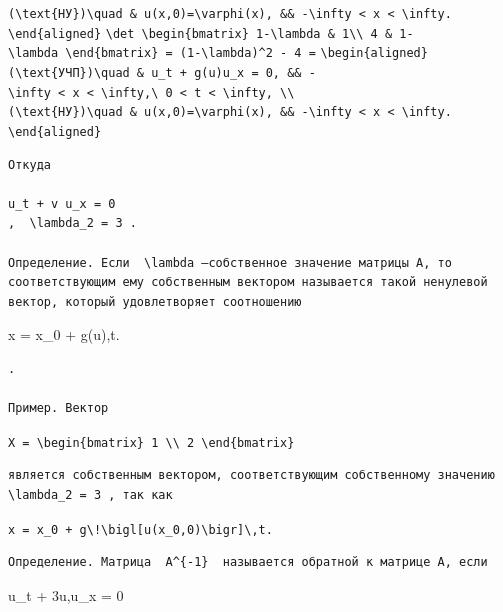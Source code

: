 \documentclass[
  ukrainian,
]{article}
\begin{document}
\texttt{(\textbackslash{}text\{НУ\})\textbackslash{}quad\ \&\ u(x,0)=\textbackslash{}varphi(x),\ \&\&\ -\textbackslash{}infty\ \textless{}\ x\ \textless{}\ \textbackslash{}infty.}
\texttt{\textbackslash{}end\{aligned\}}
\texttt{\textbackslash{}det\ \textbackslash{}begin\{bmatrix\}\ 1-\textbackslash{}lambda\ \&\ 1\textbackslash{}\textbackslash{}\ 4\ \&\ 1-\textbackslash{}lambda\ \textbackslash{}end\{bmatrix\}\ =\ (1-\textbackslash{}lambda)\^{}2\ -\ 4\ =}
\texttt{\textbackslash{}begin\{aligned\}}
\texttt{(\textbackslash{}text\{УЧП\})\textbackslash{}quad\ \&\ u\_t\ +\ g(u)u\_x\ =\ 0,\ \&\&\ -\textbackslash{}infty\ \textless{}\ x\ \textless{}\ \textbackslash{}infty,\textbackslash{}\ 0\ \textless{}\ t\ \textless{}\ \textbackslash{}infty,\ \textbackslash{}\textbackslash{}}
\texttt{(\textbackslash{}text\{НУ\})\textbackslash{}quad\ \&\ u(x,0)=\textbackslash{}varphi(x),\ \&\&\ -\textbackslash{}infty\ \textless{}\ x\ \textless{}\ \textbackslash{}infty.}
\texttt{\textbackslash{}end\{aligned\}}

\begin{verbatim}
Откуда 

u_t + v u_x = 0
,  \lambda_2 = 3 .

Определение. Если  \lambda —собственное значение матрицы A, то соответствующим ему собственным вектором называется такой ненулевой вектор, который удовлетворяет соотношению
\end{verbatim}

x = x\_0 + g(u),t.

\begin{verbatim}
.

Пример. Вектор
\end{verbatim}

\texttt{X\ =\ \textbackslash{}begin\{bmatrix\}\ 1\ \textbackslash{}\textbackslash{}\ 2\ \textbackslash{}end\{bmatrix\}}

\begin{verbatim}
является собственным вектором, соответствующим собственному значению  \lambda_2 = 3 , так как
\end{verbatim}

\texttt{x\ =\ x\_0\ +\ g\textbackslash{}!\textbackslash{}bigl{[}u(x\_0,0)\textbackslash{}bigr{]}\textbackslash{},t.}

\begin{verbatim}
Определение. Матрица  A^{-1}  называется обратной к матрице A, если
\end{verbatim}

u\_t + 3u,u\_x = 0
\end{document}
